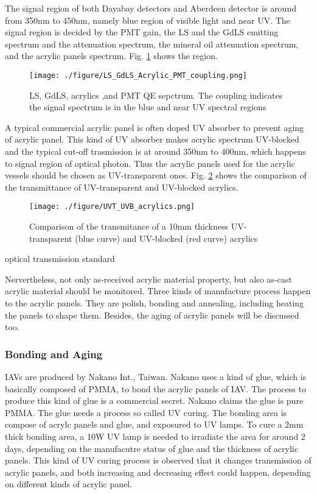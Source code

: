 The signal region of both Dayabay detectors and Aberdeen detector
is around from 350nm to 450nm, namely blue region of visible light and near UV.
The signal region is decided by the PMT gain, the LS and the GdLS emitting spectrum and
the attenuation spectrum, the mineral oil attenuation spectrum, and
the acrylic panels spectrum. Fig. \ref{fig:SpectrumCoupling} shows the region.


\begin{figure}
    \centering
    \texttt{[image: ./figure/LS\_GdLS\_Acrylic\_PMT\_coupling.png]}
    \caption{LS, GdLS, acrylics ,and PMT QE sepctrum. The coupling indicates the signal spectrum is in the blue and near UV spectral regions}
    \label{fig:SpectrumCoupling}
    \end{figure}


A typical commercial acrylic panel is often doped UV absorber
to prevent aging of acrylic panel. This kind of UV absorber makes acrylic spectrum
UV-blocked and the typical cut-off trasmission is at around 350nm to 400nm,
which happens to signal region of optical photon.
Thus the acrylic panels used for the acrylic vessels should be chosen as
UV-transparent ones. Fig. \ref{UVTUVBAcrylics} shows the comparison of the transmittance of UV-transparent
and UV-blocked acrylics.


\begin{figure}
    \centering
    \texttt{[image: ./figure/UVT\_UVB\_acrylics.png]}
    \caption{Comparison of the transmitance of a 10mm thickness UV-transparent (blue curve) and UV-blocked (red curve) acrylics}
    \label{UVTUVBAcrylics}
    \end{figure}



optical transmission standard

Nervertheless, not only as-received acrylic material property, but also as-cast
acrylic material should be monitored. Three kinds of manufacture process happen to the acrylic panels.
They are polish, bonding and annealing, including heating the panels to shape them. Besides,
the aging of acrylic panels will be discussed too.

\subsubsection {Bonding and Aging}

IAVs are produced by Nakano Int., Taiwan. Nakano uses a kind of glue, which is basically
composed of PMMA, to bond the acrylic panels of IAV. The process to produce this kind of glue is a commercial
secret. Nakano claims the glue is pure PMMA. The glue needs a process so called UV curing. The bonding area
is compose of acrylc panels and glue, and exposured to UV lamps. To cure a 2mm thick bonding
area, a 10W UV lamp is needed to irradiate the area for around 2 days, depending on the manufacutre status of glue
and the thickness of acrylic panels. This kind of UV curing process is observed that it changes transmission of acrylic panels,
and both increasing and decreasing effect could happen, depending on different kinds of acrylic panel.


